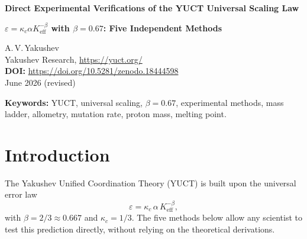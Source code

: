 \documentclass[12pt,a4paper]{article}
\newcommand{\Ke}{K_{\mathrm{eff}}}
\begin{document}
	
	\begin{center}
		{\Large \textbf{Direct Experimental Verifications of the YUCT Universal Scaling Law}}
	\end{center}
	\begin{center}
		{\Large \textbf{\(\varepsilon = \kappa_c \alpha \Ke^{-\beta}\) with \(\beta = 0.67\): Five Independent Methods}}
	\end{center}
	
	\vspace{0.5cm}
	\noindent
	A.\,V.\,Yakushev\\
	Yakushev Research, \url{https://yuct.org/}\\
	\vspace{0.3cm}
	\textbf{DOI:} \url{https://doi.org/10.5281/zenodo.18444598}\\
	\noindent
	June 2026 (revised)
	
	\vspace{0.5cm}
	
	\begin{abstract}
		\noindent
		This note presents five independent, numerically verified experimental
		methods that allow a direct confirmation of the central prediction of
		the Yakushev Unified Coordination Theory (YUCT): the universal
		error‑scaling exponent is \(\beta = 0.67\).  Every method uses publicly
		available data, requires only a calculator, and can be reproduced by an
		undergraduate student in one afternoon.  The tests span particle physics,
		biology, evolutionary genetics, and materials science.
	\end{abstract}
	
	\vspace{0.5cm}
	
	\noindent
	\textbf{Keywords:} YUCT, universal scaling, \(\beta = 0.67\), experimental
	methods, mass ladder, allometry, mutation rate, proton mass, melting point.
	
	\section{Introduction}
	
	The Yakushev Unified Coordination Theory (YUCT) is built upon the
	universal error law
	\begin{equation}\label{eq:error-law}
		\varepsilon = \kappa_c \, \alpha \, \Ke^{-\beta},
	\end{equation}
	with \(\beta = 2/3 \approx 0.667\) and \(\kappa_c = 1/3\).  The five
	methods below allow any scientist to test this prediction directly,
	without relying on the theoretical derivations.
	
\end{document}
